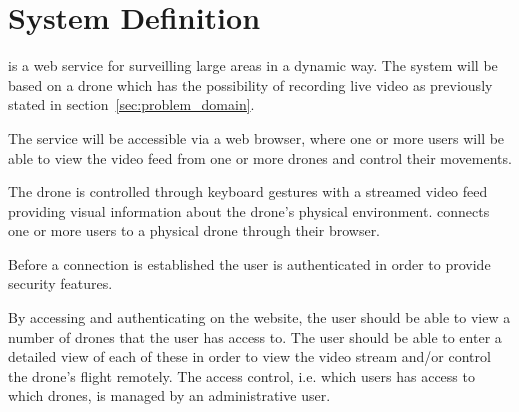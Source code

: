 \section{System Definition}
\projectname{} is a web service for surveilling large areas in a dynamic way. 
The system will be based on a drone which has the possibility of recording live video as previously stated in section~\ref{sec:problem_domain}.

The service will be accessible via a web browser, where one or more users will be able to view the video feed from one or more drones and control their movements. 

The drone is controlled through keyboard gestures with a streamed video feed providing visual information about the drone's physical environment. 
\projectname{} connects one or more users to a physical drone through their browser. 

Before a connection is established the user is authenticated in order to provide security features.

By accessing and authenticating on the website, the user should be able to view a number of drones that the user has access to.
The user should be able to enter a detailed view of each of these in order to view the video stream and/or control the drone's flight remotely. 
The access control, i.e. which users has access to which drones, is managed by an administrative user.